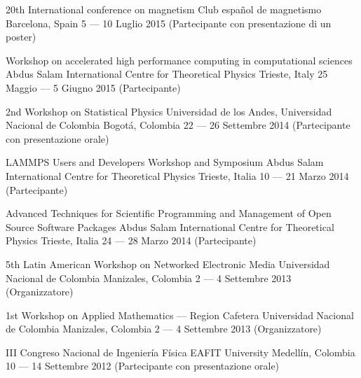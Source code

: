 \documentclass[12pt,english]{moderncv}
\begin{document}
        {20th International conference on magnetism}
        {Club español de magnetismo}
        {Barcelona, Spain}
        {5 --- 10 Luglio 2015}
        {(Partecipante con presentazione di un poster)}

        {Workshop on accelerated high performance computing in computational sciences}
        {Abdus Salam International Centre for Theoretical Physics}
        {Trieste, Italy}
        {25 Maggio --- 5 Giugno 2015}
        {(Partecipante)}

        {2nd Workshop on Statistical Physics}
        {Universidad de los Andes, Universidad Nacional de Colombia}
        {Bogotá, Colombia}
        {22 --- 26 Settembre 2014}
        {(Partecipante con presentazione orale)}

        {LAMMPS Users and Developers Workshop and Symposium}
        {Abdus Salam International Centre for Theoretical Physics}
        {Trieste, Italia}
        {10 --- 21 Marzo 2014}
        {(Partecipante)}

        {%
            Advanced Techniques for Scientific Programming and Management
            of Open Source Software Packages
        }
        {Abdus Salam International Centre for Theoretical Physics}
        {Trieste, Italia}
        {24 --- 28 Marzo 2014}
        {(Partecipante)}

        {5th Latin American Workshop on Networked Electronic Media}
        {Universidad Nacional de Colombia}
        {Manizales, Colombia}
        {2 --- 4 Settembre 2013}
        {(Organizzatore)}


        {1st Workshop on Applied Mathematics --- Region Cafetera}
        {Universidad Nacional de Colombia}
        {Manizales, Colombia}
        {2 --- 4 Settembre 2013}
        {(Organizzatore)}

        {III Congreso Nacional de Ingeniería Física}
        {EAFIT University}
        {Medellín, Colombia}
        {10 --- 14 Settembre 2012}
        {(Partecipante con presentazione orale)}
\end{document}
